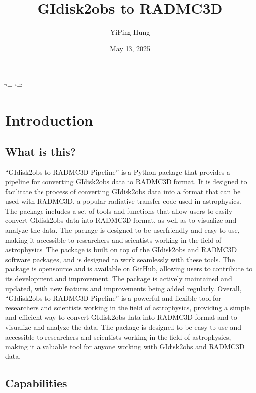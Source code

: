 \documentclass[a4paper,11pt,english]{sphinxmanual}
\title{GIdisk2obs to RADMC3D}
\date{May 13, 2025}
\author{Yi\sphinxhyphen{}Ping Hung}
\begin{document}
\ifdefined\shorthandoff
  \ifnum\catcode`\=\string=\active\shorthandoff{=}\fi
  \ifnum\catcode`\"=\active{}\fi
\fi

\pagestyle{empty}
\sphinxmaketitle
\pagestyle{plain}
\sphinxtableofcontents
\pagestyle{normal}
\label{\detokenize{index::doc}}


\sphinxstepscope


\chapter{Introduction}
\label{\detokenize{introduction:introduction}}\label{\detokenize{introduction::doc}}

\section{What is this?}
\label{\detokenize{introduction:what-is-this}}
\sphinxAtStartPar
“GIdisk2obs to RADMC3D Pipeline” is a Python package that provides a pipeline for
converting GIdisk2obs data to RADMC3D format. It is designed to facilitate the process of
converting GIdisk2obs data into a format that can be used with RADMC3D, a popular
radiative transfer code used in astrophysics. The package includes a set of tools and
functions that allow users to easily convert GIdisk2obs data into RADMC3D format, as well
as to visualize and analyze the data. The package is designed to be user\sphinxhyphen{}friendly and
easy to use, making it accessible to researchers and scientists working in the field of
astrophysics. The package is built on top of the GIdisk2obs and RADMC3D software
packages, and is designed to work seamlessly with these tools. The package is open\sphinxhyphen{}source
and is available on GitHub, allowing users to contribute to its development and
improvement. The package is actively maintained and updated, with new features and
improvements being added regularly. Overall, “GIdisk2obs to RADMC3D Pipeline” is a
powerful and flexible tool for researchers and scientists working in the field of
astrophysics, providing a simple and efficient way to convert GIdisk2obs data into
RADMC3D format and to visualize and analyze the data. The package is designed to be
easy to use and accessible to researchers and scientists working in the field of
astrophysics, making it a valuable tool for anyone working with GIdisk2obs and RADMC3D
data.


\section{Capabilities}
\label{\detokenize{introduction:capabilities}}
\end{document}
